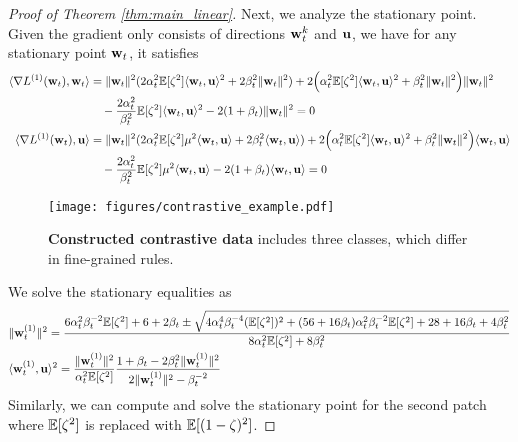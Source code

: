 \begin{proof}[Proof of Theorem \ref{thm:main_linear}]
Next, we analyze the stationary point. Given the gradient only consists of directions ${\mathbf w}_t^k$ and ${\mathbf u}$, we have for any stationary point ${\mathbf w}_t$, it satisfies
\begin{align*}
    \langle\nabla L^{(1)}({\mathbf w}_t) , {\mathbf w}_t \rangle &=\| {\mathbf w}_t \|^2( 2\alpha_t^2 {\mathbb{E}} [\zeta^2] \langle {\mathbf w}_t, {\mathbf u} \rangle^2 + 2\beta_t^2 \| {\mathbf w}_t\|^2 ) + 2 \Big( \alpha_t^2 {\mathbb{E}} [\zeta^2] \langle {\mathbf w}_t, {\mathbf u} \rangle^2 + \beta_t^2 \| {\mathbf w}_t \|^2 \Big) \| {\mathbf w}_t \|^2 \\
    &\quad - \frac{2\alpha_t^2}{\beta_t^2} {\mathbb{E}} [\zeta^2] \langle {\mathbf w}_t, {\mathbf u} \rangle^2 - 2 (1 + \beta_t)  \| {\mathbf w}_t \|^2 = 0 \\
    \langle\nabla L^{(1)}({\mathbf w}_t) , {\mathbf u} \rangle &= \| {\mathbf w}_t \|^2( 2\alpha_t^2 {\mathbb{E}} [\zeta^2] \mu^2  \langle {\mathbf w}_t, {\mathbf u} \rangle + 2\beta_t^2 \langle {\mathbf w}_t, {\mathbf u} \rangle ) + 2 \Big( \alpha_t^2 {\mathbb{E}} [\zeta^2] \langle {\mathbf w}_t, {\mathbf u} \rangle^2 + \beta_t^2 \| {\mathbf w}_t \|^2 \Big) \langle {\mathbf w}_t, {\mathbf u} \rangle \\
    &\quad - \frac{2\alpha_t^2}{\beta_t^2} {\mathbb{E}} [\zeta^2] \mu^2 \langle {\mathbf w}_t, {\mathbf u} \rangle  - 2 (1 + \beta_t) \langle {\mathbf w}_t , {\mathbf u} \rangle = 0
\end{align*}

\begin{figure}[]
  \centering  \texttt{[image: figures/contrastive\_example.pdf]}
  \vspace*{-5mm}
  \caption{\textbf{Constructed contrastive data} includes three classes, which differ in fine-grained rules.}
  \label{fig:case_contrastive}
\end{figure}


We solve the stationary equalities as 
\begin{align*}
    &\| {\mathbf w}_t^{(1)} \|^2 = \frac{6 \alpha_t^2 \beta_t^{-2} {\mathbb{E}}[\zeta^2] + 6 + 2 \beta_t \pm \sqrt{4 \alpha_t^4 \beta_t^{-4} ({\mathbb{E}} [\zeta^2])^2 + (56 + 16 \beta_t) \alpha_t^2 \beta_t^{-2} {\mathbb{E}}[\zeta^2] + 28 + 16 \beta_t + 4 \beta_t^2 }}{8 \alpha_t^2 {\mathbb{E}}[\zeta^2] + 8 \beta_t^2 }\\
    &\langle{\mathbf w}_t^{(1)}, {\mathbf u} \rangle^2 = \frac{\| {\mathbf w}_t^{(1)}\|^2}{\alpha_t^2{\mathbb{E}}[\zeta^2]} \frac{1 + \beta_t - 2 \beta_t^2 \| {\mathbf w}_t^{(1)} \|^2}{2  \| {\mathbf w}_t^{(1)} \|^2 - \beta_t^{-2} }
\end{align*}
Similarly, we can compute and solve the stationary point for the second patch where ${\mathbb{E}}[\zeta^2]$ is replaced with ${\mathbb{E}}[(1- \zeta)^2]$. 


\end{proof}
